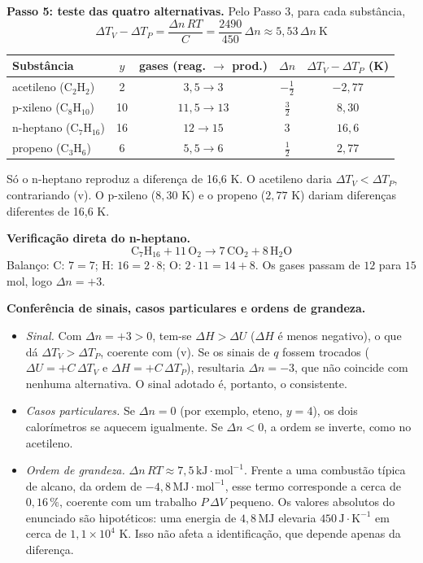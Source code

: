 \documentclass{article}%
\begin{document}
\textbf{Passo 5: teste das quatro alternativas.} Pelo Passo 3, para cada substância,
\[ \Delta T_V-\Delta T_P=\frac{\Delta n\,RT}{C}=\frac{2490}{450}\,\Delta n\approx 5{,}53\,\Delta n\ \text{K} \]

\begin{center}
\begin{tabular}{lcccc}
\hline
Substância & $y$ & gases (reag. $\rightarrow$ prod.) & $\Delta n$ & $\Delta T_V-\Delta T_P$ (K) \\
\hline
acetileno ($\text{C}_2\text{H}_2$) & 2 & $3{,}5\rightarrow 3$ & $-\frac{1}{2}$ & $-2{,}77$ \\
p-xileno ($\text{C}_8\text{H}_{10}$) & 10 & $11{,}5\rightarrow 13$ & $\frac{3}{2}$ & $8{,}30$ \\
n-heptano ($\text{C}_7\text{H}_{16}$) & 16 & $12\rightarrow 15$ & $3$ & $16{,}6$ \\
propeno ($\text{C}_3\text{H}_6$) & 6 & $5{,}5\rightarrow 6$ & $\frac{1}{2}$ & $2{,}77$ \\
\hline
\end{tabular}
\end{center}

Só o n-heptano reproduz a diferença de 16,6 K. O acetileno daria $\Delta T_V<\Delta T_P$, contrariando (v). O p-xileno ($8{,}30$ K) e o propeno ($2{,}77$ K) dariam diferenças diferentes de 16,6 K.

\textbf{Verificação direta do n-heptano.}
\[ \text{C}_7\text{H}_{16}+11\,\text{O}_2\longrightarrow 7\,\text{CO}_2+8\,\text{H}_2\text{O} \]
Balanço: C: $7=7$; H: $16=2\cdot 8$; O: $2\cdot 11=14+8$. Os gases passam de $12$ para $15$ mol, logo $\Delta n=+3$.

\textbf{Conferência de sinais, casos particulares e ordens de grandeza.}
\begin{itemize}
\item \emph{Sinal.} Com $\Delta n=+3>0$, tem-se $\Delta H>\Delta U$ ($\Delta H$ é menos negativo), o que dá $\Delta T_V>\Delta T_P$, coerente com (v). Se os sinais de $q$ fossem trocados ($\Delta U=+C\,\Delta T_V$ e $\Delta H=+C\,\Delta T_P$), resultaria $\Delta n=-3$, que não coincide com nenhuma alternativa. O sinal adotado é, portanto, o consistente.
\item \emph{Casos particulares.} Se $\Delta n=0$ (por exemplo, eteno, $y=4$), os dois calorímetros se aquecem igualmente. Se $\Delta n<0$, a ordem se inverte, como no acetileno.
\item \emph{Ordem de grandeza.} $\Delta n\,RT\approx 7{,}5\,\text{kJ}\cdot\text{mol}^{-1}$. Frente a uma combustão típica de alcano, da ordem de $-4{,}8\,\text{MJ}\cdot\text{mol}^{-1}$, esse termo corresponde a cerca de $0{,}16\,\%$, coerente com um trabalho $P\,\Delta V$ pequeno. Os valores absolutos do enunciado são hipotéticos: uma energia de $4{,}8\,\text{MJ}$ elevaria $450\,\text{J}\cdot\text{K}^{-1}$ em cerca de $1{,}1\times 10^{4}$ K. Isso não afeta a identificação, que depende apenas da diferença.
\end{itemize}
\end{document}
